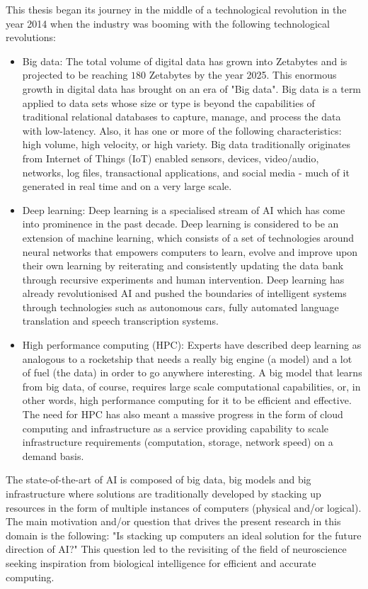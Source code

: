 This thesis began its journey in the middle of a technological revolution in the year 2014 when the industry was booming with the following technological revolutions:
\begin{itemize}
	\item Big data: The total volume of digital data has grown into Zetabytes and is projected to be reaching $180$ Zetabytes by the year 2025. This enormous growth in digital data has brought on an era of "Big data". Big data is a term applied to data sets whose size or type is beyond the capabilities of traditional relational databases to capture, manage, and process the data with low-latency. Also, it has one or more of the following characteristics: high volume, high velocity, or high variety. Big data traditionally originates from Internet of Things (IoT) enabled sensors, devices, video/audio, networks, log files, transactional applications, and social media - much of it generated in real time and on a very large scale.
	
	\item Deep learning: Deep learning is a specialised stream of AI which has come into prominence in the past decade. Deep learning is considered to be an extension of machine learning, which consists of a set of technologies around neural networks that empowers computers to learn, evolve and improve upon their own learning by reiterating and consistently updating the data bank through recursive experiments and human intervention. Deep learning has already revolutionised AI and pushed the boundaries of intelligent systems through technologies such as autonomous cars, fully automated language translation and speech transcription systems. 
	
	\item High performance computing (HPC): Experts have described deep learning as analogous to a rocketship that needs a really big engine (a model) and a lot of fuel (the data) in order to go anywhere interesting. A big model that learns from big data, of course, requires large scale computational capabilities, or, in other words, high performance computing for it to be efficient and effective. The need for HPC has also meant a massive progress in the form of cloud computing and infrastructure as a service providing capability to scale infrastructure requirements (computation, storage, network speed) on a demand basis.  
	
\end{itemize}

The state-of-the-art of AI is composed of big data, big models and big infrastructure where solutions are traditionally developed by stacking up resources in the form of multiple instances of computers (physical and/or logical). The main motivation and/or question that drives the present research in this domain is the following: "Is stacking up computers an ideal solution for the future direction of AI?" This question led to the revisiting of the field of neuroscience seeking inspiration from biological intelligence for efficient and accurate computing. 

